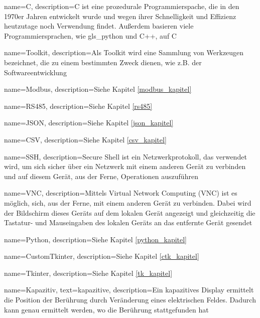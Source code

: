 {
	name=C,
	description={C ist eine prozedurale Programmierspache, die in den 1970er Jahren entwickelt wurde und wegen ihrer Schnelligkeit und Effizienz heutzutage noch Verwendung findet. Außerdem basieren viele Programmiersprachen, wie \zB \gls{gls_python} und C++, auf C}
}

{
	name=Toolkit,
	description={Als Toolkit wird eine Sammlung von Werkzeugen bezeichnet, die zu einem bestimmten Zweck dienen, wie z.B. der Softwareentwicklung}
}

{
	name=Modbus,
	description={Siehe Kapitel \ref{modbus_kapitel} }
}

{
	name=RS485,
	description={Siehe Kapitel \ref{rs485} }
}

{
	name=JSON,
	description={Siehe Kapitel \ref{json_kapitel} }
}

{
	name=CSV,
	description={Siehe Kapitel \ref{csv_kapitel} }
}

{
	name=SSH,
	description={Secure Shell ist ein Netzwerkprotokoll, das verwendet wird, um sich sicher über ein Netzwerk mit einem anderen Gerät zu verbinden und auf diesem Gerät, aus der Ferne, Operationen auszuführen}
}

{
	name=VNC,
	description={Mittels Virtual Network Computing (VNC) ist es möglich, sich, aus der Ferne, mit einem anderen Gerät zu verbinden. Dabei wird der Bildschirm dieses Geräts auf dem lokalen Gerät angezeigt und gleichzeitig die Tastatur- und Mauseingaben des lokalen Geräts an das entfernte Gerät gesendet}
}

{
	name=Python,
	description={Siehe Kapitel \ref{python_kapitel} }
}

{
	name=CustomTkinter,
	description={Siehe Kapitel \ref{ctk_kapitel} }
}

{
	name=Tkinter,
	description={Siehe Kapitel \ref{tk_kapitel} }
}

{
	name=Kapazitiv,
    	text=kapazitive,
	description={Ein kapazitives Display ermittelt die Position der Berührung durch Veränderung eines elektrischen Feldes. Dadurch kann genau ermittelt werden, wo die Berührung stattgefunden hat}
}

